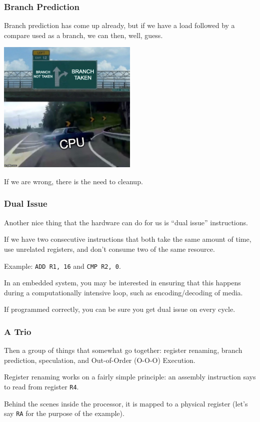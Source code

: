 \begin{frame}
\frametitle{Branch Prediction}

Branch prediction has come up already, but if we have a load followed by a compare used as a branch, we can then, well, guess. 

\begin{center}
	\includegraphics[width=0.5\textwidth]{images/branch.jpg}
\end{center}

If we are wrong, there is the need to cleanup.

\end{frame}



\begin{frame}
\frametitle{Dual Issue}

Another nice thing that the hardware can do for us is ``dual issue'' instructions. 

If we have two consecutive instructions that both take the same amount of time, use unrelated registers, and don't consume two of the same resource.

Example: \texttt{ADD R1, 16} and \texttt{CMP R2, 0}. 

In an embedded system, you may be interested in ensuring that this happens during a computationally intensive loop, such as encoding/decoding of media. 

If programmed correctly, you can be sure you get dual issue on every cycle.


\end{frame}




\begin{frame}
\frametitle{A Trio}

Then a group of things that somewhat go together: register renaming, branch prediction, speculation, and Out-of-Order (O-O-O) Execution. 

Register renaming works on a fairly simple principle: an assembly instruction says to read from register \texttt{R4}. 

Behind the scenes inside the processor, it is mapped to a physical register (let's say \texttt{RA} for the purpose of the example).


\end{frame}



